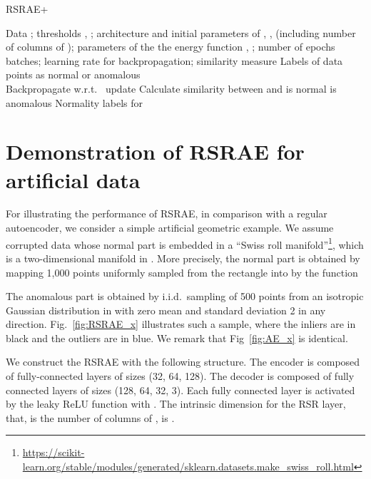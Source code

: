 \documentclass{article} \usepackage{iclr2020_conference,times}
\begin{document}
 \begin{algorithm}[ht] 
 \caption{RSRAE+
}
 \label{alg:the_alg_plus}
 \begin{algorithmic}[1]
 \renewcommand{\algorithmicrequire}{\textbf{Input:}}
 \renewcommand{\algorithmicensure}{\textbf{Output:}}
 \REQUIRE Data ; thresholds , ;  architecture and initial parameters of , ,  (including number of columns of ); parameters of the the energy function , ; number of epochs  batches; learning rate for backpropagation; similarity measure
 \ENSURE  Labels of data points as normal or anomalous \\

  \IF {}
  \STATE Backpropagate  w.r.t.~  update 
  \ENDIF
  \ENDFOR
  \ENDFOR
  \FOR{}
  \STATE Calculate similarity between
   and 
  \STATE  is normal
  \ELSE
 \STATE  is anomalous
 \ENDIF
 \ENDFOR
 \RETURN Normality labels for 
 \end{algorithmic} 
 \end{algorithm}

\newpage

\section{Demonstration of RSRAE for artificial data}
\label{sec:artificial}

For illustrating the performance of RSRAE, in comparison with a regular autoencoder, we consider a simple artificial geometric example.
We assume corrupted data whose normal part is embedded in a ``Swiss roll manifold''\footnote{\url{https://scikit-learn.org/stable/modules/generated/sklearn.datasets.make\_swiss\_roll.html}}, which is a two-dimensional manifold in . More precisely, the normal part is obtained by mapping 1,000 points uniformly sampled from the rectangle  into  by the function
 
The anomalous part is obtained by i.i.d.~sampling of 500 points from an isotropic Gaussian distribution in  with zero mean and standard deviation 2 in any direction. Fig.~\ref{fig:RSRAE_x} illustrates such a sample, where the inliers are in black and the outliers are in blue. We remark that Fig~\ref{fig:AE_x} is identical.

We construct the RSRAE with the following structure. The encoder is composed of fully-connected layers of sizes (32, 64, 128). The decoder is composed of fully connected layers of sizes (128, 64, 32, 3). Each fully connected layer is activated by the leaky ReLU function with . The intrinsic dimension for the RSR layer, that, is the number of columns of , is .
\end{document}

